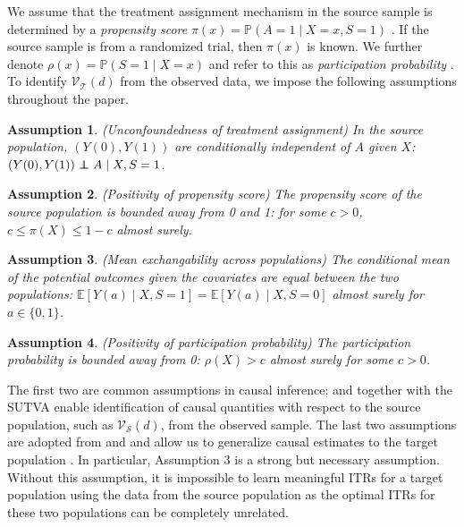 \documentclass[12pt]{article}
\newtheorem{assumption}{Assumption}
\newcommand{\E}{\mathbb{E}}
\newcommand{\prob}{\mathbb{P}}
\newcommand\independent{\protect\mathpalette{\protect\independenT}{\perp}}
\def\independenT#1#2{\mathrel{\rlap{$#1#2$}\mkern2mu{#1#2}}}
\begin{document}
We assume that the treatment assignment mechanism in the source sample is determined by a \textit{propensity score} $\pi(x) = \prob (A = 1 \mid X = x, S=1)$ \citep{rosenbaum1983central}.  If the source sample is from a randomized trial, then $\pi(x)$ is known.
 We further denote $\rho(x) = \prob(S=1 \mid X=x)$ and refer to this as \textit{participation probability} \citep{dahabreh2020extending}. To identify $\mathcal{V}_\mathcal{T}(d)$ from the observed data, we impose the following assumptions throughout the paper.

\begin{assumption}
\label{assp:unconf}
    (Unconfoundedness of treatment assignment)
    In the source population, $(Y(0), Y(1))$ are conditionally independent of $A$ given $X$:
    $(Y(0), Y(1)) \independent A \mid X, S=1$.
\end{assumption}
\begin{assumption}
\label{assp:ovlptrt}
    (Positivity of propensity score)
    The propensity score of the source population is bounded away from 0 and 1: for some $c > 0$, $c \le \pi(X) \le 1 - c$ almost surely. 
\end{assumption}

\begin{assumption}
\label{assp:exchange}
    (Mean exchangability across populations)
    The conditional mean of the potential outcomes given the covariates are equal between the two populations: $\E [Y(a) \mid X, S=1] = \E [Y(a) \mid X, S=0]$ almost surely for $a \in \{0, 1\}$.
\end{assumption}
\begin{assumption}
\label{assp:ovlppop}
    (Positivity of participation probability)
    The participation probability is bounded away from 0: $\rho(X) > c$ almost surely for some $c > 0$. 
\end{assumption}

The first two are common assumptions in causal inference; and together with the SUTVA enable identification of causal quantities with respect to the source population, such as $\mathcal{V}_\mathcal{S}(d)$, from the observed sample. The last two assumptions are adopted from \citet{dahabreh2020extending} and \citet{Rudolph2017} and allow us to generalize causal estimates to the target population \citep{colnet2020causal}. In particular, Assumption $3$ is a strong but necessary assumption. Without this assumption, it is impossible to learn meaningful ITRs for a target population using the data from the source population as the optimal ITRs for these two populations can be completely unrelated.  
\end{document}
